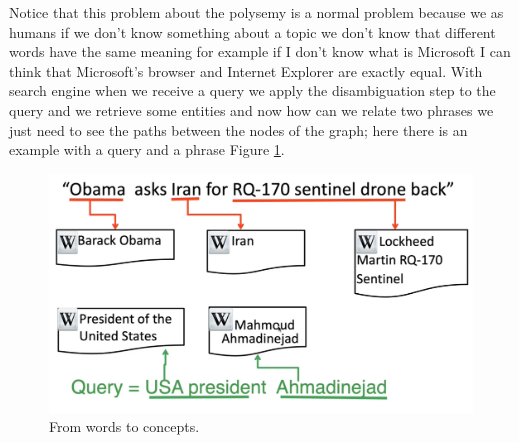 Notice that this problem about the polysemy is a normal problem because we as humans if we don't know something about a topic we don't know that different words have the same meaning for example if I don't know what is Microsoft I can think that Microsoft's browser and Internet Explorer are exactly equal.\newline
With search engine when we receive a query we apply the disambiguation step to the query and we retrieve some entities and now how can we relate two phrases we just need to see the paths between the nodes of the graph; here there is an example with a query and a phrase Figure \ref{fig:fromwords}.\newline
\begin{figure}
    \centering
    \includegraphics[width=0.75\linewidth]{images/fromwordsto.PNG}
    \caption{From words to concepts.}
    \label{fig:fromwords}
\end{figure}